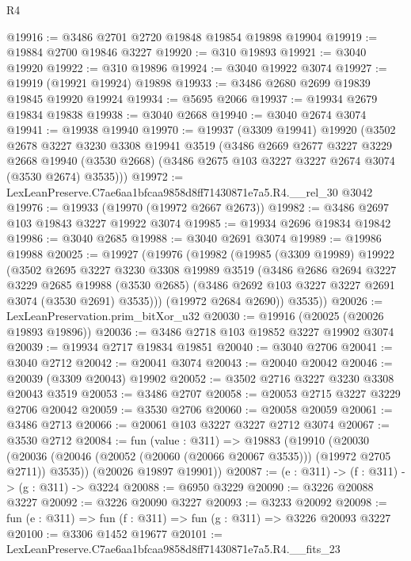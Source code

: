 \begin{lexlean}{R4}
\begin{coremodule}
@19916 := @3486 @2701 @2720 @19848 @19854 @19898 @19904
@19919 := @19884 @2700 @19846 @3227
@19920 := @310 @19893
@19921 := @3040 @19920
@19922 := @310 @19896
@19924 := @3040 @19922 @3074
@19927 := @19919 (@19921 @19924) @19898
@19933 := @3486 @2680 @2699 @19839 @19845 @19920 @19924
@19934 := @5695 @2066
@19937 := @19934 @2679 @19834 @19838
@19938 := @3040 @2668
@19940 := @3040 @2674 @3074
@19941 := @19938 @19940
@19970 := @19937
    (@3309 @19941)
    @19920
    (@3502
      @2678
      @3227
      @3230
      @3308
      @19941
      @3519
      (@3486
        @2669
        @2677
        @3227
        @3229
        @2668
        @19940
        (@3530 @2668)
        (@3486 @2675 @103 @3227 @3227 @2674 @3074 (@3530 @2674) @3535)))
@19972 := LexLeanPreserve.C7ae6aa1bfcaa9858d8ff71430871e7a5.R4.__rel_30 @3042
@19976 := @19933 (@19970 (@19972 @2667 @2673))
@19982 := @3486 @2697 @103 @19843 @3227 @19922 @3074
@19985 := @19934 @2696 @19834 @19842
@19986 := @3040 @2685
@19988 := @3040 @2691 @3074
@19989 := @19986 @19988
@20025 := @19927
    (@19976
      (@19982
        (@19985
          (@3309 @19989)
          @19922
          (@3502
            @2695
            @3227
            @3230
            @3308
            @19989
            @3519
            (@3486
              @2686
              @2694
              @3227
              @3229
              @2685
              @19988
              (@3530 @2685)
              (@3486 @2692 @103 @3227 @3227 @2691 @3074 (@3530 @2691) @3535)))
          (@19972 @2684 @2690))
        @3535))
@20026 := LexLeanPreservation.prim_bitXor_u32
@20030 := @19916 (@20025 (@20026 @19893 @19896))
@20036 := @3486 @2718 @103 @19852 @3227 @19902 @3074
@20039 := @19934 @2717 @19834 @19851
@20040 := @3040 @2706
@20041 := @3040 @2712
@20042 := @20041 @3074
@20043 := @20040 @20042
@20046 := @20039 (@3309 @20043) @19902
@20052 := @3502 @2716 @3227 @3230 @3308 @20043 @3519
@20053 := @3486 @2707
@20058 := @20053 @2715 @3227 @3229 @2706 @20042
@20059 := @3530 @2706
@20060 := @20058 @20059
@20061 := @3486 @2713
@20066 := @20061 @103 @3227 @3227 @2712 @3074
@20067 := @3530 @2712
@20084 := fun (value : @311) =>
  @19883
    (@19910
      (@20030 (@20036 (@20046 (@20052 (@20060 (@20066 @20067 @3535))) (@19972 @2705 @2711)) @3535))
      (@20026 @19897 @19901))
@20087 := (e : @311) -> (f : @311) -> (g : @311) -> @3224
@20088 := @6950 @3229
@20090 := @3226 @20088 @3227
@20092 := @3226 @20090 @3227
@20093 := @3233 @20092
@20098 := fun (e : @311) => fun (f : @311) => fun (g : @311) => @3226 @20093 @3227
@20100 := @3306 @1452 @19677
@20101 := LexLeanPreserve.C7ae6aa1bfcaa9858d8ff71430871e7a5.R4.__fits_23

\end{coremodule}
\end{lexlean}
